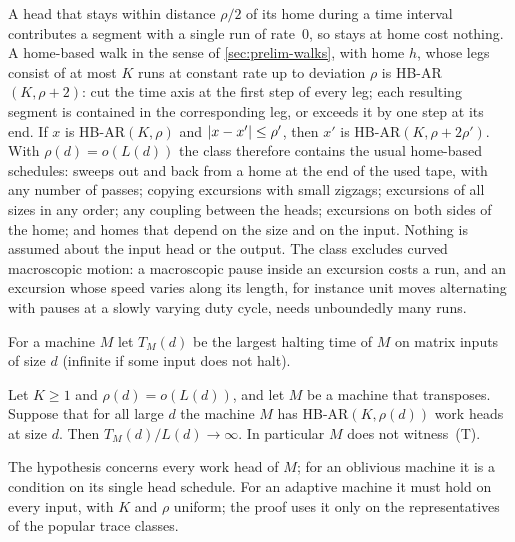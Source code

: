 \begin{remark}\label{rem:mot-hbar}
A head that stays within distance $\rho/2$ of its home during a time interval contributes a segment with a single run
of rate~$0$, so stays at home cost nothing. A home-based walk in the sense of \cref{sec:prelim-walks}, with home $h$,
whose legs consist of at most $K$ runs at constant rate up to deviation $\rho$ is HB-AR$(K,\rho+2)$: cut the time axis
at the first step of every leg; each resulting segment is contained in the corresponding leg, or exceeds it by one step
at its end. If $x$ is HB-AR$(K,\rho)$ and $\lvert x-x' \rvert\le\rho'$, then $x'$ is HB-AR$(K,\rho+2\rho')$. With $\rho(d)=o(L(d))$ the
class therefore contains the usual home-based schedules: sweeps out and back from a home at the end of the used tape,
with any number of passes; copying excursions with small zigzags; excursions of all sizes in any order; any coupling
between the heads; excursions on both sides of the home; and homes that depend on the size and on the input. Nothing is
assumed about the input head or the output. The class excludes curved macroscopic motion: a macroscopic pause inside an
excursion costs a run, and an excursion whose speed varies along its length, for instance unit moves alternating with
pauses at a slowly varying duty cycle, needs unboundedly many runs.
\end{remark}

For a machine $M$ let $T_M(d)$ be the largest halting time of $M$ on matrix inputs of size $d$ (infinite if some input
does not halt).

\begin{theorem}\label{thm:C}
\notformalized
Let $K\ge1$ and $\rho(d)=o(L(d))$, and let $M$ be a machine that transposes. Suppose that for all large $d$ the machine
$M$ has HB-AR$(K,\rho(d))$ work heads at size $d$. Then $T_M(d)/L(d)\to\infty$. In particular $M$ does not witness~(T).
\end{theorem}

The hypothesis concerns every work head of $M$; for an oblivious machine it is a condition on its single head
schedule. For an adaptive machine it must hold on every input, with $K$ and $\rho$ uniform; the proof uses it only on
the representatives of the popular trace classes.

